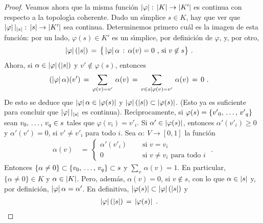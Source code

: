 \begin{proof}
	Veamos ahora que la misma funci\'{o}n
	$\left|\varphi\right|:\,\left|K\right|\rightarrow\left|K'\right|$ es continua con
	respecto a la topolog\'{\i}a coherente. Dado un s\'{\i}mplice
	$s\in K$, hay que ver que
	$\left|\varphi\right||_{\left|s\right|}:\,\left|s\right|\rightarrow\left|K'\right|$ sea
	continua. Determinemos primero cu\'{a}l es la imagen de esta
	funci\'{o}n: por un lado, $\varphi(s)\in K'$ es un s\'{\i}mplice,
	por definici\'{o}n de $\varphi$, y, por otro,
	\begin{align*}
		\left|\varphi\right|(\left|s\right|) & \,=\,
			\big\{\left|\varphi\right|\alpha\,:\,
				\alpha(v)=0\text{ , si }v\not\in s\big\}
		\text{ .}
	\end{align*}
	Ahora, si $\alpha\in\left|\varphi\right|(\left|s\right|)$ y $v'\not\in\varphi(s)$,
	entonces
	\begin{align*}
		(\left|\varphi\right|\alpha)(v') & \,=\,
			\sum_{\varphi(v)=v'}\,\alpha(v) \,=\,
			\sum_{v\in s|\varphi(v)=v'}\,\alpha(v)\,=\,0
		\text{ .}
	\end{align*}
	De esto se deduce que $\left|\varphi\right|\alpha\in\left|\varphi(s)\right|$ y
	$\left|\varphi\right|(\left|s\right|)\subset\left|\varphi(s)\right|$.
	(Esto ya es suficiente para concluir que $\left|\varphi\right||_{\left|s\right|}$
	es continua). Rec\'{\i}procamente, si $\varphi(s)=\{\lista[0]{v'}{q}\}$
	sean $\lista[0]{v}{q}\in s$ tales que $\varphi(v_{i})=v'_{i}$. Si
	$\alpha'\in\left|\varphi(s)\right|$, entonces $\alpha'(v'_{i})\geq 0$ y
	$\alpha'(v')=0$, si $v'\not=v'_{i}$ para todo $i$. Sea
	$\alpha:\,V\rightarrow [0,1]$ la funci\'{o}n
	\begin{align*}
		\alpha(v) & \,=\,
			\begin{cases}
				\alpha'(v'_{i}) &\quad\text{ si } v=v_{i} \\
				0 & \quad\text{ si } v\not =v_{i}
					\text{ para todo } i
			\end{cases}
		\text{ .}
	\end{align*}
	Entonces $\{\alpha\not=0\}\subset\{\lista[0]{v}{q}\}\subset s$ y
	$\sum_{v}\,\alpha(v)=1$. En particular, $\{\alpha\not =0\}\in K$
	y $\alpha\in\left|K\right|$. Pero, adem\'{a}s, $\alpha(v)=0$, si
	$v\not\in s$, con lo que $\alpha\in\left|s\right|$ y, por definici\'{o}n,
	$\left|\varphi\right|\alpha=\alpha'$. En definitiva,
	$\left|\varphi(s)\right|\subset\left|\varphi\right|(\left|s\right|)$ y
	\begin{align*}
		\left|\varphi\right|(\left|s\right|) & \,=\,\left|\varphi(s)\right|
		\text{ .}
	\end{align*}


\end{proof}
